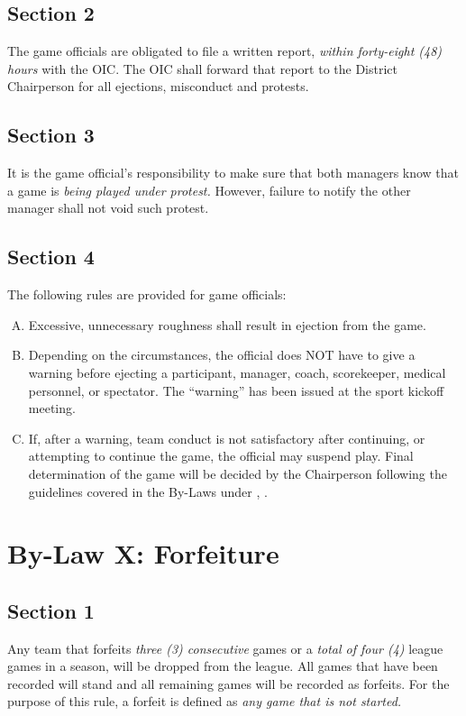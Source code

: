 \subsection{Section 2}
\label{ssec:bylaw-9-2}
The game officials are obligated to file a written report, {\em within forty-eight (48) hours} with the OIC. The OIC shall forward that report to the District Chairperson for all ejections, misconduct and protests.

\subsection{Section 3}
\label{ssec:bylaw-9-3}
It is the game official's responsibility to make sure that both managers know that a game is {\em being played under protest.}  However, failure to notify the other manager shall not void such protest.

\subsection{Section 4}
\label{ssec:bylaw-9-4}
The following rules are provided for game officials:

\begin{enumerate}[A.]
    \item Excessive, unnecessary roughness shall result in ejection from the game.
    \item Depending on the circumstances, the official does NOT have to give a warning before ejecting a participant, manager, coach, scorekeeper, medical personnel, or spectator. The “warning” has been issued at the sport kickoff meeting.
    \item If, after a warning, team conduct is not satisfactory after continuing, or attempting to continue the game, the official may suspend play.  Final determination of the game will be decided by the Chairperson following the guidelines covered in the By-Laws under , .
\end{enumerate}

\section{By-Law X: Forfeiture}
\label{sec:bylaw-10}
\subsection{Section 1}
\label{ssec:bylaw-10-1}
Any team that forfeits {\em three (3) consecutive} games or a {\em total of four (4)} league games in a season, will be dropped from the league.  All games that have been recorded will stand and all remaining games will be recorded as forfeits.  For the purpose of this rule, a forfeit is defined as {\em any game that is not started.}

